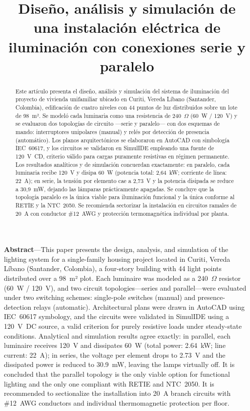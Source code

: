 \documentclass[conference]{IEEEtran}
\title{Diseño, análisis y simulación de una instalación eléctrica de iluminación con conexiones serie y paralelo}
\author{
  \IEEEauthorblockN{Julio Paez, Jhon Cañas, Juan Arias, Jose Candela, Jorge Forero}
  \IEEEauthorblockA{Unidades Tecnológicas de Santander\\ \\
  Correos: \texttt{Jjorgepaez@uts.edu.co}, \texttt{jacanas@uts.edu.co}, \texttt{jharias@uts.edu.co},\\ \texttt{jalejandrocandela@uts.edu.co}, \texttt{jluisforero@uts.edu.co}}
}
\begin{document}
\maketitle

\begin{abstract}
Este artículo presenta el diseño, análisis y simulación del sistema de iluminación del proyecto de vivienda unifamiliar ubicado en Curiti, Vereda Líbano (Santander, Colombia), edificación de cuatro niveles con 44 puntos de luz distribuidos sobre un lote de 98~m². Se modeló cada luminaria como una resistencia de 240~$\Omega$ (60~W / 120~V) y se evaluaron dos topologías de circuito —serie y paralelo— con dos esquemas de mando: interruptores unipolares (manual) y relés por detección de presencia (automático). Los planos arquitectónicos se elaboraron en AutoCAD con simbología IEC~60617, y los circuitos se validaron en SimulIDE empleando una fuente de 120~V~CD, criterio válido para cargas puramente resistivas en régimen permanente. Los resultados analíticos y de simulación concuerdan exactamente: en paralelo, cada luminaria recibe 120~V y disipa 60~W (potencia total: 2{,}64~kW; corriente de línea: 22~A); en serie, la tensión por elemento cae a 2{,}73~V y la potencia disipada se reduce a 30{,}9~mW, dejando las lámparas prácticamente apagadas. Se concluye que la topología paralelo es la única viable para iluminación funcional y la única conforme al RETIE y la NTC~2050. Se recomienda sectorizar la instalación en circuitos ramales de 20~A con conductor \#12~AWG y protección termomagnética individual por planta.
\end{abstract}

\textbf{Abstract}—This paper presents the design, analysis, and simulation of the lighting system for a single-family housing project located in Curiti, Vereda Líbano (Santander, Colombia), a four-story building with 44 light points distributed over a 98~m² plot. Each luminaire was modeled as a 240~$\Omega$ resistor (60~W / 120~V), and two circuit topologies—series and parallel—were evaluated under two switching schemes: single-pole switches (manual) and presence-detection relays (automatic). Architectural plans were drawn in AutoCAD using IEC~60617 symbology, and the circuits were validated in SimulIDE using a 120~V~DC source, a valid criterion for purely resistive loads under steady-state conditions. Analytical and simulation results agree exactly: in parallel, each luminaire receives 120~V and dissipates 60~W (total power: 2.64~kW; line current: 22~A); in series, the voltage per element drops to 2.73~V and the dissipated power is reduced to 30.9~mW, leaving the lamps virtually off. It is concluded that the parallel topology is the only viable option for functional lighting and the only one compliant with RETIE and NTC~2050. It is recommended to sectionalize the installation into 20~A branch circuits with \#12~AWG conductors and individual thermomagnetic protection per floor.
\end{document}
